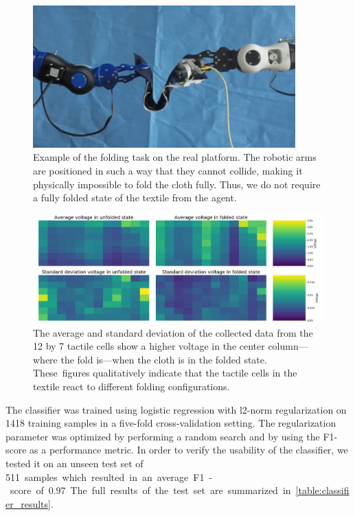 \documentclass[\home/main.tex]{subfiles}
\begin{document}
\begin{figure}[htpb]
    \centering
    \includegraphics[width=0.90\textwidth, keepaspectratio]{figures/folded_real.png}
    \caption{Example of the folding task on the real platform. The robotic arms are positioned in such a way that they cannot collide, making it physically impossible to fold the cloth fully. Thus, we do not require a fully folded state of the textile from the agent.}
    \label{fig:folded_real}
\end{figure}

\begin{figure}[htpb]
    \centering
    \includegraphics[width=\textwidth, keepaspectratio]{figures/sensor_data_over_states.png}
    \caption{The average and standard deviation of the collected data from the 12 by 7 tactile cells show a higher voltage in the center column---where the fold is---when the cloth is in the folded state. These~figures qualitatively indicate that the tactile cells in the textile react to different folding configurations. }
    \label{fig:sensor_data}
\end{figure}

The classifier was trained using logistic regression with l2-norm regularization on \qty{1418}{} training samples in a five-fold cross-validation setting. The regularization parameter was optimized by performing a random search and by using the F1-score as a performance metric. In order to verify the usability of the classifier, we tested it on an unseen test set of \qty{511} samples which resulted in an average F1-score of \qty{0.97}{}. The full results of the test set are summarized in \cref{table:classifier_results}.
\end{document}
